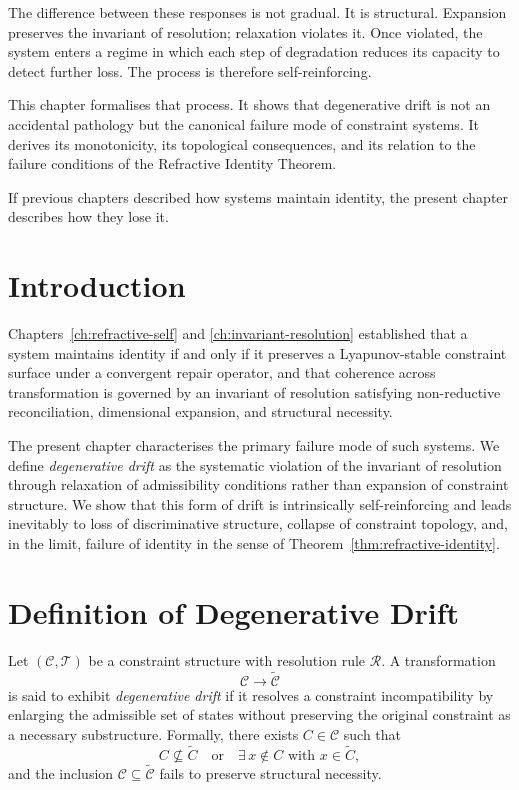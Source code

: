 \documentclass[11pt,openany]{book}
\begin{document}
The difference between these responses is not gradual.  It
is structural.  Expansion preserves the invariant of
resolution; relaxation violates it.  Once violated, the
system enters a regime in which each step of degradation
reduces its capacity to detect further loss.  The process
is therefore self-reinforcing.

This chapter formalises that process.  It shows that
degenerative drift is not an accidental pathology but the
canonical failure mode of constraint systems.  It derives
its monotonicity, its topological consequences, and its
relation to the failure conditions of the Refractive
Identity Theorem.

If previous chapters described how systems maintain
identity, the present chapter describes how they lose it.

\section{Introduction}
\label{sec:intro-degenerative}

Chapters~\ref{ch:refractive-self} and
\ref{ch:invariant-resolution} established that a system
maintains identity if and only if it preserves a
Lyapunov-stable constraint surface under a convergent
repair operator, and that coherence across transformation
is governed by an invariant of resolution satisfying
non-reductive reconciliation, dimensional expansion, and
structural necessity.

The present chapter characterises the primary failure mode
of such systems.  We define \emph{degenerative drift} as
the systematic violation of the invariant of resolution
through relaxation of admissibility conditions rather than
expansion of constraint structure.  We show that this form
of drift is intrinsically self-reinforcing and leads
inevitably to loss of discriminative structure, collapse of
constraint topology, and, in the limit, failure of identity
in the sense of Theorem~\ref{thm:refractive-identity}.

\section{Definition of Degenerative Drift}
\label{sec:definition-drift}

\begin{definition}
\label{def:degenerative-drift}
Let $(\mathcal{C}, \mathcal{T})$ be a constraint structure
with resolution rule $\mathcal{R}$.  A transformation
\[
  \mathcal{C} \longrightarrow \widetilde{\mathcal{C}}
\]
is said to exhibit \emph{degenerative drift} if it resolves
a constraint incompatibility by enlarging the admissible
set of states without preserving the original constraint as
a necessary substructure.  Formally, there exists
$C \in \mathcal{C}$ such that
\[
  C \not\subseteq \widetilde{C}
  \quad \text{or} \quad
  \exists\, x \notin C \text{ with } x \in \widetilde{C},
\]
and the inclusion $\mathcal{C} \subseteq \widetilde{\mathcal{C}}$
fails to preserve structural necessity.
\end{definition}
\end{document}
